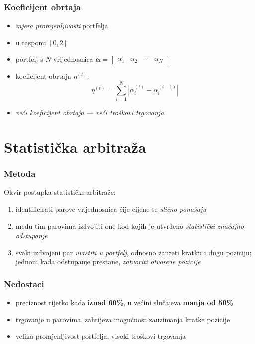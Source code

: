 \documentclass[11pt, notheorems]{beamer}
\newcommand{\q}{\left}
\newcommand{\w}{\right}
\newcommand{\matr}[1]{\mathbold{#1}}
\begin{document}
  \begin{frame}
    \frametitle{Koeficijent obrtaja}
    \begin{itemize}
      \item \emph{mjera promjenljivosti} portfelja
      \item u rasponu $\q[0, 2\w]$
      \item portfelj s $N$ vrijednosnica $\matr{\alpha} = \begin{bmatrix} \alpha_1 & \alpha_2 & \cdots & \alpha_N \end{bmatrix}$
      \item \alert{koeficijent obrtaja} $\eta^{(t)}$:
      \begin{equation*}
        \eta^{(t)} = \sum_{i=1}^{N} \q \lvert \alpha_i^{(t)} - \alpha_i^{(t-1)} \w \rvert
      \end{equation*}
      \item \emph{veći koeficijent obrtaja --- veći troškovi trgovanja}
    \end{itemize}
  \end{frame}
  
  \section{Statistička arbitraža}
  \begin{frame}
    \frametitle{Metoda}
    Okvir postupka statističke arbitraže:
    \begin{enumerate}
      \item identificirati parove vrijednosnica čije cijene se \emph{slično ponašaju}
      \item među tim parovima izdvojiti one kod kojih je utvrđeno \emph{statistički značajno odstupanje}
      \item svaki izdvojeni par \emph{uvrstiti u portfelj}, odnosno zauzeti \alert{kratku} i \alert{dugu} poziciju; jednom kada odstupanje prestane, \emph{zatvoriti otvorene pozicije}
    \end{enumerate}
  \end{frame}

  \begin{frame}
    \frametitle{Nedostaci}
    \begin{itemize}
      \item preciznost rijetko kada \textbf{iznad 60\%}, u većini slučajeva \textbf{manja od 50\%}
      \item trgovanje u parovima, zahtijeva mogućnost zauzimanja \alert{kratke pozicije}
      \item velika promjenljivost portfelja, \alert{visoki troškovi trgovanja}
    \end{itemize}
  \end{frame}
\end{document}

